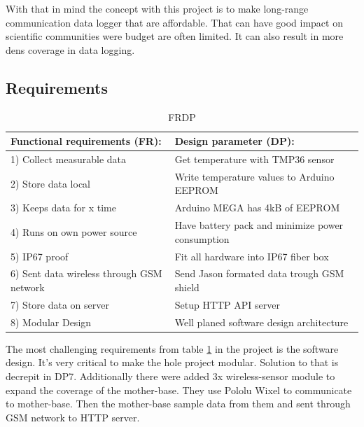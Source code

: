 With that in mind the concept with this project is to make long-range communication data logger that are affordable. That can have good impact on scientific communities were budget are often limited. It can also result in more dens coverage in data logging. 

\subsection{Requirements}
\begin{table}[h!]
	\caption{FRDP}
	\label{tbl:FRDP}
\begin{tabular}{|p{8cm}|p{8cm}|}
		\hline \textbf{Functional requirements (FR):} & \textbf{Design parameter (DP):} \\ 
		\hline 1) Collect measurable data &   Get temperature with TMP36 sensor\\
		\hline 2) Store data local &   Write temperature values to Arduino EEPROM \\
		\hline 3) Keeps data for x time &  Arduino MEGA \cite{arduinoMega} has 4kB of EEPROM \\
		\hline 4) Runs on own power source & Have battery pack and minimize power consumption \\ 
		\hline 5) IP67 proof &   Fit all hardware into IP67 fiber box\\
		\hline 6) Sent data wireless through GSM network & Send Jason formated data trough GSM shield \\ 
		\hline 7) Store data on server & Setup HTTP API server \\ 
		\hline 8) Modular Design & Well planed software design architecture \\ 
		\hline
	\end{tabular}
\end{table}

The most challenging requirements from table \ref{tbl:FRDP} in the project is the software design. It's very critical to make the hole project modular. Solution to that is decrepit in DP7. Additionally there were added 3x wireless-sensor module to expand the coverage of the mother-base. They use Pololu Wixel to communicate to mother-base. Then the mother-base sample data from them and sent through GSM network to HTTP server.

